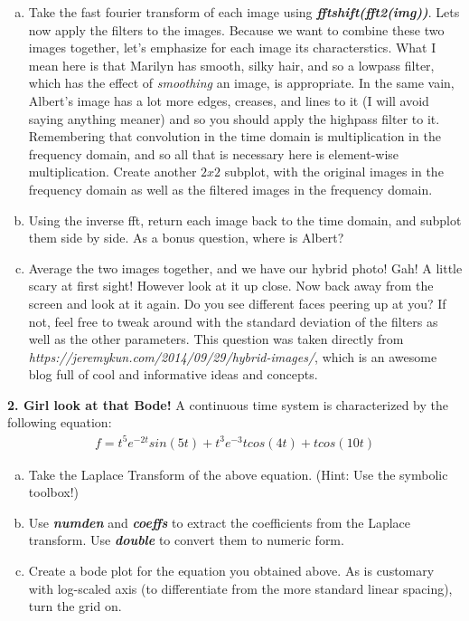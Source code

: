 \documentclass[11pt]{article}
\begin{document}
\begin{enumerate}[a.]
    \item Take the fast fourier transform of each image using
    \textit{\textbf{fftshift(fft2(img))}}.
    Lets now apply the filters to the images.
    Because we want to combine these two images together,
    let's emphasize for each image its characterstics.
    What I mean here is that Marilyn has smooth, silky hair,
    and so a lowpass filter, which has the effect of \textit{smoothing}
    an image, is appropriate.
    In the same vain, Albert's image has a lot more edges, creases, and lines to it 
    (I will avoid saying anything meaner) and so you should apply the highpass filter
    to it.
    Remembering that convolution in the time domain is multiplication in the frequency domain,
    and so all that is necessary here is element-wise multiplication.
    Create another $2x2$ subplot, with the original images in the frequency domain
    as well as the filtered images in the frequency domain.

    \item Using the inverse fft,
    return each image back to the time domain, and subplot them side by side.
    As a bonus question, where is Albert?

    \item Average the two images together, and we have our hybrid photo!
    Gah! A little scary at first sight!
    However look at it up close. Now back away from the screen and look at it again.
    Do you see different faces peering up at you?
    If not, feel free to tweak around with the standard deviation of the filters as 
    well as the other parameters.
    This question was taken directly from 
    \textit{https://jeremykun.com/2014/09/29/hybrid-images/},
    which is an awesome blog full of cool and informative ideas and concepts. 
\end{enumerate}


\noindent
\newline
\textbf{2. Girl look at that Bode!}
A continuous time system is characterized by the following equation:
\begin{align*}
    f=t^5e^{−2t}sin(5t) +t^3e^{−3}tcos(4t) +tcos(10t)
\end{align*}

\begin{enumerate}[a.]
    \item Take the Laplace Transform of the above equation. 
    (Hint: Use the symbolic toolbox!)
    
    \item Use \textbf{\textit{numden}} and \textbf{\textit{coeffs}}
    to extract the coefficients from the Laplace transform. 
    Use \textbf{\textit{double}} to convert them to numeric form.
    
    \item Create a bode plot for the equation you obtained above. 
    As is customary with log-scaled axis (to differentiate from the
    more standard linear spacing), turn the grid on.
\end{enumerate}
\end{document}
